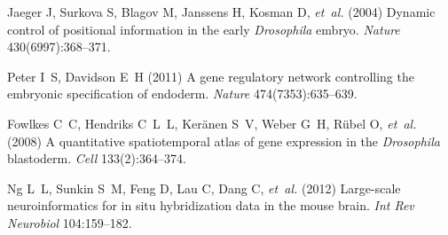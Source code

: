 \documentclass{pnastwo}
\begin{document}
\begin{article}





%
%

\begin{thebibliography}{10}

Jaeger J, Surkova S, Blagov M, Janssens H, Kosman D, \textit{et~al.} (2004)
  Dynamic control of positional information in the early \textit{{D}rosophila}
  embryo. \textit{Nature} 430(6997):368--371.

Peter I~S, Davidson E~H (2011) A gene regulatory network controlling the
  embryonic specification of endoderm. \textit{Nature} 474(7353):635--639.

Fowlkes C~C, Hendriks C~L~L, Ker{\"a}nen S~V, Weber G~H, R{\"u}bel O,
  \textit{et~al.} (2008) A quantitative spatiotemporal atlas of gene expression
  in the \textit{{D}rosophila} blastoderm. \textit{Cell} 133(2):364--374.

Ng L~L, Sunkin S~M, Feng D, Lau C, Dang C, \textit{et~al.} (2012) Large-scale
  neuroinformatics for in situ hybridization data in the mouse brain.
  \textit{Int Rev Neurobiol} 104:159--182.


\end{thebibliography}
\end{article}
\end{document}
